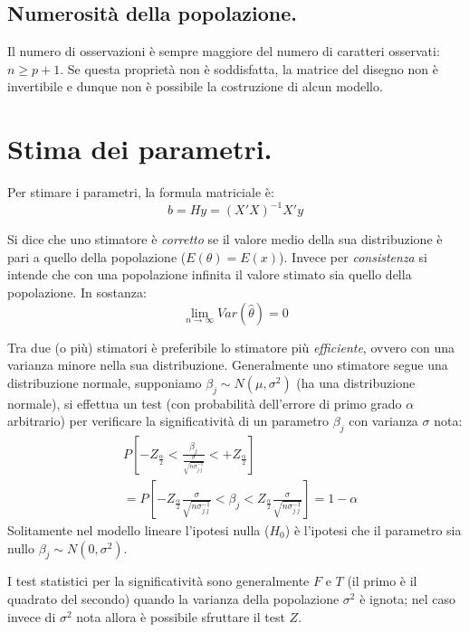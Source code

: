 \documentclass[11pt, twocolumn]{article}
\begin{document}
\subsection*{Numerosità della popolazione.}
Il numero di osservazioni è sempre maggiore del numero di caratteri osservati: $n \geq p + 1$.
Se questa proprietà non è soddisfatta, la matrice del disegno non è invertibile e dunque non è possibile la costruzione di alcun modello.


\section{Stima dei parametri.}
Per stimare i parametri, la formula matriciale è:
\begin{equation*}
  b = Hy = (X'X)^{-1}X' y
\end{equation*}

Si dice che uno stimatore è \textit{corretto} se il valore medio della sua distribuzione è pari a quello della popolazione ($E(\theta) = E(x)$).
Invece per \textit{consistenza} si intende che con una popolazione infinita il valore stimato sia quello della popolazione.
In sostanza:
\begin{equation*}
  \lim_{n\to\infty} Var(\hat{\theta}) = 0
\end{equation*}

Tra due (o più) stimatori è preferibile lo stimatore più \textit{efficiente}, ovvero con una varianza minore nella sua distribuzione.
Generalmente uno stimatore segue una distribuzione normale, supponiamo $\beta_j \sim N(\mu,\sigma^2)$ (ha una distribuzione normale), si effettua un test (con probabilità dell'errore di primo grado $\alpha$ arbitrario) per verificare la significatività di un parametro $\beta_j$ con varianza $\sigma$ nota:
\begin{align*}
  &P[-Z_{\frac{\alpha}{2}} < \frac{\beta_j}{\frac{\sigma}{\sqrt{n\sigma^{-1}_{j.j}}}} < +Z_{\frac{\alpha}{2}}] \\
  &= P[-Z_{\frac{\alpha}{2}} \frac{\sigma}{\sqrt{n\sigma^{-1}_{j.j}}} < \beta_j < Z_{\frac{\alpha}{2}} \frac{\sigma}{\sqrt{n\sigma^{-1}_{j.j}}}] = 1 - \alpha
\end{align*}
Solitamente nel modello lineare l'ipotesi nulla ($H_0$) è l'ipotesi che il parametro sia nullo $\beta_j \sim N(0,\sigma^2)$.

I test statistici per la significatività sono generalmente $F$ e $T$ (il primo è il quadrato del secondo) quando la varianza della popolazione $\sigma^2$ è ignota; nel caso invece di $\sigma^2$ nota allora è possibile sfruttare il test $Z$.
\end{document}
